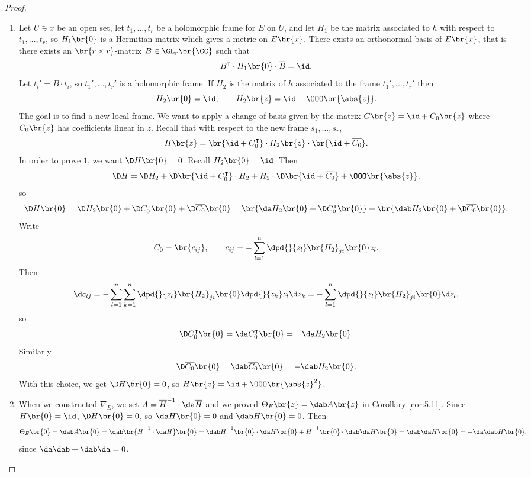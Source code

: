 \begin{proof}
\hfill
\begin{enumerate}
\item Let $ U \ni x $ be an open set, let $ t_1, \dots, t_r $ be a holomorphic frame for $ E $ on $ U $, and let $ H_1 $ be the matrix associated to $ h $ with respect to $ t_1, \dots, t_r $, so $ H_1\br{0} $ is a Hermitian matrix which gives a metric on $ E\br{x} $. There exists an orthonormal basis of $ E\br{x} $, that is there exists an $ \br{r \times r} $-matrix $ B \in \GL_r\br{\CC} $ such that
$$ B^\intercal \cdot H_1\br{0} \cdot \overline{B} = \id. $$
Let $ t_i' = B \cdot t_i $, so $ t_1', \dots, t_r' $ is a holomorphic frame. If $ H_2 $ is the matrix of $ h $ associated to the frame $ t_1', \dots, t_r' $ then
$$ H_2\br{0} = \id, \qquad H_2\br{z} = \id + \OOO\br{\abs{z}}. $$
The goal is to find a new local frame. We want to apply a change of basis given by the matrix $ C\br{z} = \id + C_0\br{z} $ where $ C_0\br{z} $ has coefficients linear in $ z $. Recall that with respect to the new frame $ s_1, \dots, s_r $,
$$ H\br{z} = \br{\id + C_0^\intercal} \cdot H_2\br{z} \cdot \br{\id + \overline{C_0}}. $$
In order to prove $ 1 $, we want $ \D H\br{0} = 0 $. Recall $ H_2\br{0} = \id $. Then
$$ \D H = \D H_2 + \D\br{\id + C_0^\intercal} \cdot H_2 + H_2 \cdot \D\br{\id + \overline{C_0}} + \OOO\br{\abs{z}}, $$
so
$$ \D H\br{0} = \D H_2\br{0} + \D C_0^\intercal\br{0} + \D\overline{C_0}\br{0} = \br{\da H_2\br{0} + \D C_0^\intercal\br{0}} + \br{\dab H_2\br{0} + \D\overline{C_0}\br{0}}. $$
Write
$$ C_0 = \br{c_{ij}}, \qquad c_{ij} = -\sum_{l = 1}^n \dpd{}{z_l}\br{H_2}_{ji}\br{0}z_l. $$
Then
$$ \d c_{ij} = -\sum_{l = 1}^n \sum_{k = 1}^n \dpd{}{z_l}\br{H_2}_{ji}\br{0}\dpd{}{z_k}z_l\d z_k = -\sum_{l = 1}^n \dpd{}{z_l}\br{H_2}_{ji}\br{0}\d z_l, $$
so
$$ \D C_0^\intercal\br{0} = \da C_0^\intercal\br{0} = -\da H_2\br{0}. $$
Similarly
$$ \D\overline{C_0}\br{0} = \dab\overline{C_0}\br{0} = -\dab H_2\br{0}. $$
With this choice, we get $ \D H\br{0} = 0 $, so $ H\br{z} = \id + \OOO\br{\abs{z}^2} $.


\item When we constructed $ \nabla_E $, we set $ A = \overline{H}^{-1} \cdot \da\overline{H} $ and we proved $ \Theta_E\br{z} = \dab A\br{z} $ in Corollary \ref{cor:5.11}. Since $ H\br{0} = \id $, $ \D H\br{0} = 0 $, so $ \da H\br{0} = 0 $ and $ \dab H\br{0} = 0 $. Then
$$ \Theta_E\br{0} = \dab A\br{0} = \dab\br{\overline{H}^{-1} \cdot \da\overline{H}}\br{0} = \dab\overline{H}^{-1}\br{0} \cdot \da\overline{H}\br{0} + \overline{H}^{-1}\br{0} \cdot \dab\da\overline{H}\br{0} = \dab\da\overline{H}\br{0} = -\da\dab\overline{H}\br{0}, $$
since $ \da\dab + \dab\da = 0 $.
\end{enumerate}
\end{proof}

